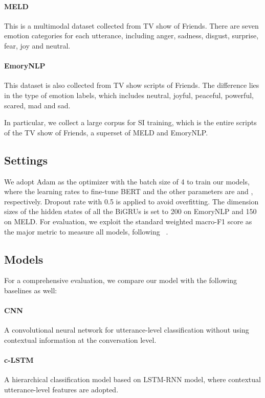\documentclass{article}
\def\newcite#1{\citeauthor{#1}~\shortcite{#1}}
\begin{document}
\begin{CJK}{UTF8}{gbsn}
\paragraph{MELD} \cite{poria2019meld} This is a multimodal dataset collected from TV show of Friends. There are seven emotion categories for each utterance, including anger, sadness, disgust, surprise, fear, joy and neutral.

\paragraph{EmoryNLP} \cite{Zahiri2018emotion} This dataset is also collected from TV show scripts of Friends. The difference lies in the type of emotion labels, which includes neutral, joyful, peaceful, powerful, scared, mad and sad.

In particular, we collect a large corpus for SI training, which is the entire scripts of the TV show of Friends, a superset of MELD and EmoryNLP.


\subsection{Settings}
We adopt Adam as the optimizer with the batch size of 4 to train our models, where the learning rates to fine-tune BERT and the other parameters are  and , respectively. Dropout rate with 0.5 is applied to avoid overfitting.
The dimension sizes of the hidden states of all the BiGRUs is set to 200 on EmoryNLP and 150 on MELD.
For evaluation, we exploit the standard weighted macro-F1 score as the major metric to measure all models, following \newcite{zhong2019knowledge}.



\subsection{Models}

For a comprehensive evaluation, we compare our model with the following baselines as well:

\paragraph{CNN} \cite{kim2014convolutional} A convolutional neural network for utterance-level classification without using contextual information at the conversation level.

\paragraph{c-LSTM} \cite{poria2017context} A hierarchical classification model based on LSTM-RNN model, where contextual utterance-level features are adopted.


\end{CJK}
\end{document}
